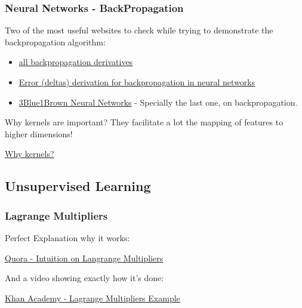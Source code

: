 \subsubsection{Neural Networks - BackPropagation}

Two of the most useful websites to check while trying to demonstrate the backpropagation algorithm:
\begin{itemize}
    \item \href{https://medium.com/@pdquant/all-the-backpropagation-derivatives-d5275f727f60}{\ul{all backpropagation derivatives}}
    \item \href{https://stats.stackexchange.com/questions/94387/how-to-derive-errors-in-neural-network-with-the-backpropagation-algorithm}{\ul{Error (deltas) derivation for backpropagation in neural networks}}
    \item \href{https://www.youtube.com/playlist?list=PLZHQObOWTQDNU6R1_67000Dx_ZCJB-3pi}{3Blue1Brown Neural Networks} - Specially the last one, on backpropagation.
    
\end{itemize}



Why kernels are important? They facilitate a lot the mapping of features to higher dimensions!

\href{https://medium.com/@zxr.nju/what-is-the-kernel-trick-why-is-it-important-98a98db0961d}{\ul{Why kernels?}}



\subsection{Unsupervised Learning}

\subsubsection{Lagrange Multipliers}

Perfect Explanation why it works:

\href{https://www.quora.com/Why-does-the-method-of-Lagrange-multipliers-work-for-optimization-in-multivariable-calculus-Why-exactly-given-a-function-f-x-y-and-a-constraint-g-x-y-c-can-we-set-the-gradients-of-the-functions-to-be-multiples-of-each-other}{\ul{Quora - Intuition on Langrange Multipliers}}

And a video showing exactly how it's done:

\href{https://www.youtube.com/watch?v=yuqB-d5MjZA}{\ul{Khan Academy - Lagrange Multipliers Example}}



